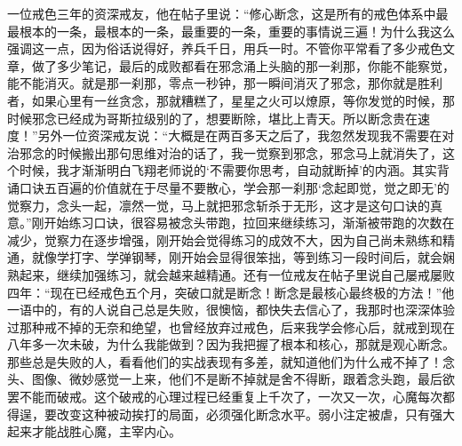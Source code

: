 一位戒色三年的资深戒友，他在帖子里说：“修心断念，这是所有的戒色体系中最最根本的一条，最根本的一条，最重要的一条，重要的事情说三遍！为什么我这么强调这一点，因为俗话说得好，养兵千日，用兵一时。不管你平常看了多少戒色文章，做了多少笔记，最后的成败都看在邪念涌上头脑的那一刹那，你能不能察觉，能不能消灭。就是那一刹那，零点一秒钟，那一瞬间消灭了邪念，那你就是胜利者，如果心里有一丝贪念，那就糟糕了，星星之火可以燎原，等你发觉的时候，那时候邪念已经成为哥斯拉级别的了，想要断除，堪比上青天。所以断念贵在速度！”另外一位资深戒友说：“大概是在两百多天之后了，我忽然发现我不需要在对治邪念的时候搬出那句思维对治的话了，我一觉察到邪念，邪念马上就消失了，这个时候，我才渐渐明白飞翔老师说的‘不需要你思考，自动就断掉’的内涵。其实背诵口诀五百遍的价值就在于尽量不要散心，学会那一刹那‘念起即觉，觉之即无’的觉察力，念头一起，凛然一觉，马上就把邪念斩杀于无形，这才是这句口诀的真意。”刚开始练习口诀，很容易被念头带跑，拉回来继续练习，渐渐被带跑的次数在减少，觉察力在逐步增强，刚开始会觉得练习的成效不大，因为自己尚未熟练和精通，就像学打字、学弹钢琴，刚开始会显得很笨拙，等到练习一段时间后，就会娴熟起来，继续加强练习，就会越来越精通。还有一位戒友在帖子里说自己屡戒屡败四年：“现在已经戒色五个月，突破口就是断念！断念是最核心最终极的方法！”他一语中的，有的人说自己总是失败，很懊恼，都快失去信心了，我那时也深深体验过那种戒不掉的无奈和绝望，也曾经放弃过戒色，后来我学会修心后，就戒到现在八年多一次未破，为什么我能做到？因为我把握了根本和核心，那就是观心断念。那些总是失败的人，看看他们的实战表现有多差，就知道他们为什么戒不掉了！念头、图像、微妙感觉一上来，他们不是断不掉就是舍不得断，跟着念头跑，最后欲罢不能而破戒。这个破戒的心理过程已经重复上千次了，一次又一次，心魔每次都得逞，要改变这种被动挨打的局面，必须强化断念水平。弱小注定被虐，只有强大起来才能战胜心魔，主宰内心。

